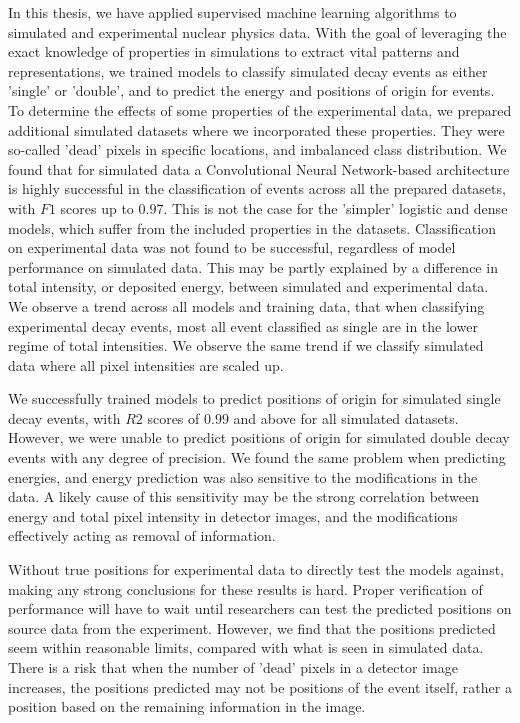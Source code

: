 In this thesis, we have applied supervised machine learning algorithms to simulated and experimental
nuclear physics data. With the goal of leveraging the exact knowledge of properties in simulations to extract
vital patterns and representations, we trained models to classify simulated decay events as either 'single'
or 'double', and to predict the energy and positions of origin for events. To determine the effects of
some properties of the experimental data, we prepared additional simulated datasets where we incorporated
these properties. They were so-called 'dead' pixels in specific locations, and imbalanced class distribution.
We found that for simulated data a Convolutional Neural Network-based architecture is highly successful in the
classification of events across all the prepared datasets, with $F1$ scores up to $0.97$. 
This is not the case for the 'simpler' logistic and dense models, which suffer from the included properties 
in the datasets.
Classification on experimental data was not found to be successful, regardless of model performance on
simulated data. This may be partly explained by a difference in total intensity, or deposited energy,
between simulated and experimental data. We observe a trend across all models and training data, that
when classifying experimental decay events, most all event classified as single are in the lower
regime of total intensities. We observe the same trend if we classify simulated data where all pixel
intensities are scaled up.

We successfully trained models to predict positions of origin for simulated single decay events,
with $R2$ scores of $0.99$ and above for all simulated datasets. However, we were unable to
predict positions of origin for simulated double decay events with any degree of precision.
We found the same problem when predicting energies, and energy prediction was also sensitive
to the modifications in the data. A likely cause of this sensitivity may be the strong correlation
between energy and total pixel intensity in detector images, and the modifications effectively
acting as removal of information.

Without true positions for experimental data to directly test the models against,
making any strong conclusions for these results is hard. Proper verification of performance 
will have to wait until researchers can test the predicted positions on source data from the
experiment. However, we find that the positions predicted seem within reasonable limits, compared
with what is seen in simulated data. There is a risk that when the number of 'dead' pixels in a detector
image increases, the positions predicted may not be positions of the event itself, rather a position
based on the remaining information in the image.

